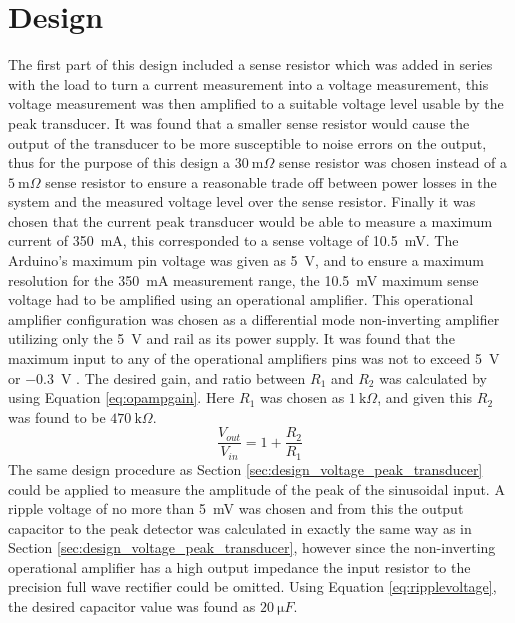 \section{Design} \label{sec:design_current_peak_transducer}
The first part of this design included a sense resistor which was added in series with the load to turn a current measurement into a voltage measurement, this voltage measurement was then amplified to a suitable voltage level usable by the peak transducer. It was found that a smaller sense resistor would cause the output of the transducer to be more susceptible to noise errors on the output, thus for the purpose of this design a $\SI{30}{\milli \Omega}$ sense resistor was chosen instead of a $\SI{5}{\milli \Omega}$ sense resistor to ensure a reasonable trade off between power losses in the system and the measured voltage level over the sense resistor. Finally it was chosen that the current peak transducer would be able to measure a maximum current of \SI{350}{\milli A}, this corresponded to a sense voltage of \SI{10.5}{\milli V}.\vspace{4mm} \newline
The Arduino's maximum pin voltage was given as \SI{5}{\volt}, and to ensure a maximum resolution for the \SI{350}{\milli A} measurement range, the \SI{10.5}{\milli V} maximum sense voltage had to be amplified using an operational amplifier. This operational amplifier configuration was chosen as a differential mode non-inverting amplifier utilizing only the \SI{5}{\volt} and rail as its power supply. It was found that the maximum input to any of the operational amplifiers pins was not to exceed \SI{5}{\volt} or \SI{-0.3}{\volt} \cite{TLC2272:2016}.
The desired gain, and ratio between $R_1$ and $R_2$ was calculated by using Equation \ref{eq:opampgain}. Here $R_1$ was chosen as $\SI{1}{\kilo \Omega}$, and given this $R_2$ was found to be $\SI{470}{\kilo \Omega}$.\newline
\begin{equation}
   \frac{V_{out}}{V_{in}}=1+\frac{R_2}{R_1} 
   \label{eq:opampgain}
\end{equation}
The same design procedure as Section \ref{sec:design_voltage_peak_transducer} could be applied to measure the amplitude of the peak of the sinusoidal input. A ripple voltage of no more than \SI{5}{\milli \volt} was chosen and from this the output capacitor to the peak detector was calculated in exactly the same way as in Section \ref{sec:design_voltage_peak_transducer}, however since the non-inverting operational amplifier has a high output impedance the input resistor to the precision full wave rectifier could be omitted. Using Equation \ref{eq:ripplevoltage}, the desired capacitor value was found as $\SI{20}{\micro F}$.\vspace{4mm} \newline
